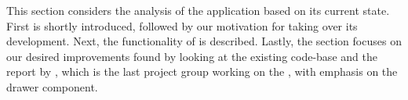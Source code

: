 This section considers the analysis of the \launcher application based on its current state.
First \launcher is shortly introduced, followed by our motivation for taking over its development.
Next, the functionality of \launcher is described.
Lastly, the section focuses on our desired improvements found by looking at the existing code-base and the report by \citet{launcher2012}, which is the last project group working on the \launcher, with emphasis on the drawer component.